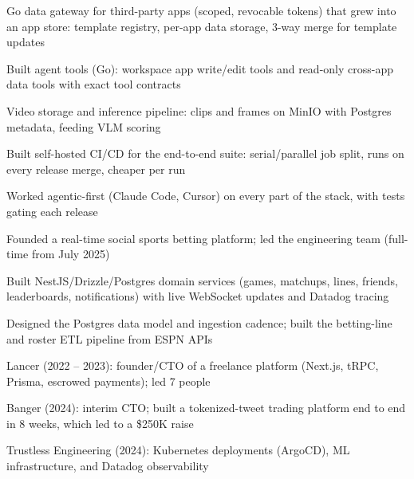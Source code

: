 \documentclass[print]{jack-resume}
\begin{document}
\begin{tightemize}
    \item Go data gateway for third-party apps (scoped, revocable tokens) that grew into an app store: template registry, per-app data storage, 3-way merge for template updates
    \item Built agent tools (Go): workspace app write/edit tools and read-only cross-app data tools with exact tool contracts
    \item Video storage and inference pipeline: clips and frames on MinIO with Postgres metadata, feeding VLM scoring
    \item Built self-hosted CI/CD for the end-to-end suite: serial/parallel job split, runs on every release merge, cheaper per run
    \item Worked agentic-first (Claude Code, Cursor) on every part of the stack, with tests gating each release
\end{tightemize}
\sectionsep

\begin{tightemize}
    \item Founded a real-time social sports betting platform; led the engineering team (full-time from July 2025)
    \item Built NestJS/Drizzle/Postgres domain services (games, matchups, lines, friends, leaderboards, notifications) with live WebSocket updates and Datadog tracing
    \item Designed the Postgres data model and ingestion cadence; built the betting-line and roster ETL pipeline from ESPN APIs
\end{tightemize}
\sectionsep

\begin{tightemize}
    \item Lancer (2022 -- 2023): founder/CTO of a freelance platform (Next.js, tRPC, Prisma, escrowed payments); led 7 people
    \item Banger (2024): interim CTO; built a tokenized-tweet trading platform end to end in 8 weeks, which led to a \$250K raise
    \item Trustless Engineering (2024): Kubernetes deployments (ArgoCD), ML infrastructure, and Datadog observability
\end{tightemize}
\sectionsep
\end{document}
